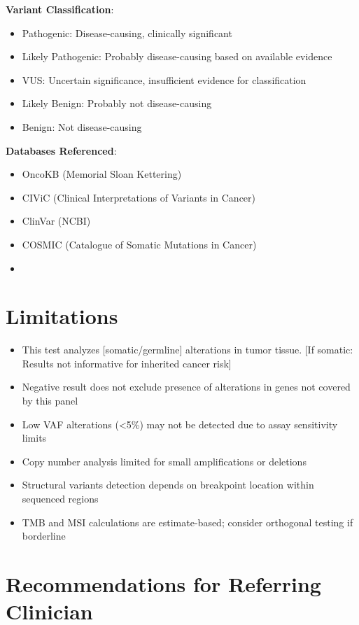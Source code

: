 \documentclass[10pt,letterpaper]{article}
\begin{document}
\textbf{Variant Classification}:
\begin{itemize}
\item Pathogenic: Disease-causing, clinically significant
\item Likely Pathogenic: Probably disease-causing based on available evidence
\item VUS: Uncertain significance, insufficient evidence for classification
\item Likely Benign: Probably not disease-causing
\item Benign: Not disease-causing
\end{itemize}

\textbf{Databases Referenced}:
\begin{itemize}
\item OncoKB (Memorial Sloan Kettering)
\item CIViC (Clinical Interpretations of Variants in Cancer)
\item ClinVar (NCBI)
\item COSMIC (Catalogue of Somatic Mutations in Cancer)
\item [Others - PMKB, CGI, etc.]
\end{itemize}

\section{Limitations}

\begin{itemize}
\item This test analyzes [somatic/germline] alterations in tumor tissue. [If somatic: Results not informative for inherited cancer risk]
\item Negative result does not exclude presence of alterations in genes not covered by this panel
\item Low VAF alterations (<5\%) may not be detected due to assay sensitivity limits
\item Copy number analysis limited for small amplifications or deletions
\item Structural variants detection depends on breakpoint location within sequenced regions
\item TMB and MSI calculations are estimate-based; consider orthogonal testing if borderline
\end{itemize}

\section{Recommendations for Referring Clinician}
\end{document}
